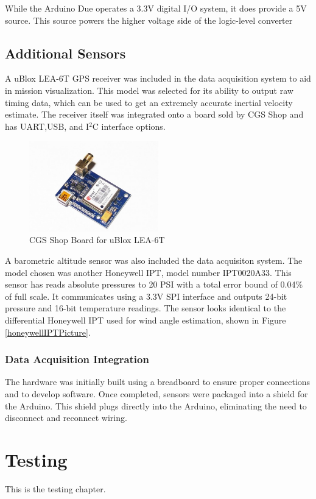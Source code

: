 \documentclass[12pt]{ucthesis}
\begin{document}
While the Arduino Due operates a 3.3V digital I/O system, it does provide a 5V source. This source powers the higher voltage side of the logic-level converter

\section{Additional Sensors}
A uBlox LEA-6T GPS receiver was included in the data acquisition system to aid in mission visualization. This model was selected for its ability to output raw timing data, which can be used to get an extremely accurate inertial velocity estimate\cite{ubloxDemo}. The receiver itself was integrated onto a board sold by CGS Shop and has UART,USB, and I$^2$C interface options.

\begin{figure}[H]
  \caption{CGS Shop Board for uBlox LEA-6T} \label{gpsPicture}
  \centering
    \includegraphics[width=0.5\textwidth]{figures/gpsBoard.jpg}
\end{figure}

A barometric altitude sensor was also included the data acquisiton system. The model chosen was another Honeywell IPT, model number IPT0020A33. This sensor has reads absolute pressures to 20 PSI with a total error bound of 0.04\% of full scale. It communicates using a 3.3V SPI interface and outputs 24-bit pressure and 16-bit temperature readings. The sensor looks identical to the differential Honeywell IPT used for wind angle estimation, shown in Figure \ref{honeywellIPTPicture}.

\subsection{Data Acquisition Integration}
The hardware was initially built using a breadboard to ensure proper connections and to develop software. Once completed, sensors were packaged into a shield for the Arduino. This shield plugs directly into the Arduino, eliminating the need to disconnect and reconnect wiring. 
\chapter{Testing}
\label{testing}
This is the testing chapter.
\end{document}

